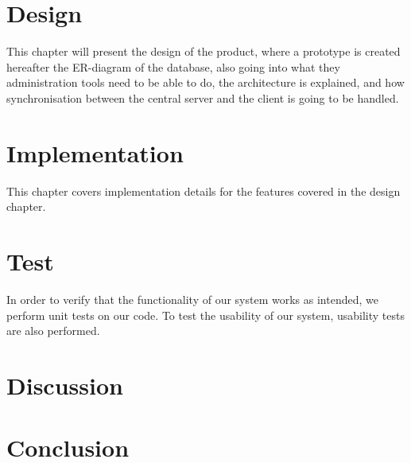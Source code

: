 	\chapter{Design}
	This chapter will present the design of the product, where a prototype is created hereafter the ER-diagram of the database, also going into what they administration tools need to be able to do, the architecture is explained, and how synchronisation between the central server and the client is going to be handled.
	
	
	
	
	
	
	
	\chapter{Implementation}
	This chapter covers implementation details for the features covered in the design chapter.
	
	
	
	
	
	
	
	
	
	
	
	
	
	\chapter{Test}
	In order to verify that the functionality of our system works as intended, we perform unit tests on our code. 
    To test the usability of our system, usability tests are also performed.
	
	
	
	\chapter{Discussion}
	
	
	
	\chapter{Conclusion}
	
	\afterpage{\thispagestyle{empty}}

	
	
	\label{lastpagewithoutappendix}

	\appendix
	
	
	
	\cleardoublepage


